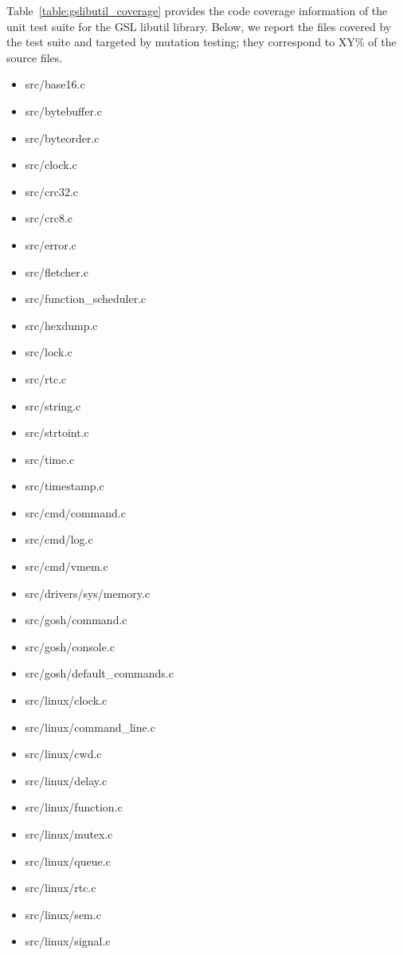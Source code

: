 Table~\ref{table:gslibutil_coverage} provides the code coverage information of the unit test suite for the GSL libutil library. 
Below, we report the files covered by the test suite and targeted by mutation testing; they correspond to XY\% of the source files.

\begin{itemize}
	\item src/base16.c
	\item src/bytebuffer.c
	\item src/byteorder.c
	\item src/clock.c
	\item src/crc32.c
	\item src/crc8.c
	\item src/error.c
	\item src/fletcher.c
	\item src/function\_scheduler.c
	\item src/hexdump.c
	\item src/lock.c
	\item src/rtc.c
	\item src/string.c
	\item src/strtoint.c
	\item src/time.c
	\item src/timestamp.c
	\item src/cmd/command.c
	\item src/cmd/log.c
	\item src/cmd/vmem.c
	\item src/drivers/sys/memory.c
	\item src/gosh/command.c
	\item src/gosh/console.c
	\item src/gosh/default\_commands.c
	\item src/linux/clock.c
	\item src/linux/command\_line.c
	\item src/linux/cwd.c
	\item src/linux/delay.c
	\item src/linux/function.c
	\item src/linux/mutex.c
	\item src/linux/queue.c
	\item src/linux/rtc.c
	\item src/linux/sem.c
	\item src/linux/signal.c

\end{itemize}
